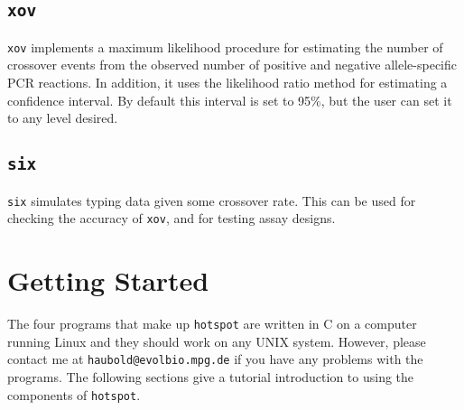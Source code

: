 \documentclass{article}
\newcommand{\ty}{\texttt}
\begin{document}
\subsection{\ty{xov}}
\ty{xov} implements a maximum likelihood procedure for estimating the
number of crossover events from the observed number of positive and
negative allele-specific PCR reactions. In addition, it uses the
likelihood ratio method for estimating a confidence interval. By
default this interval is set to 95\%, but the user can set it to any
level desired.

\subsection{\ty{six}}
\ty{six} simulates typing data given some crossover rate. This can be
used for checking the accuracy of \ty{xov}, and for testing assay
designs. 

\section{Getting Started}
The four programs that make up \ty{hotspot} are written in C on a computer running Linux and
they should
work on any UNIX system. However, please contact me at
\ty{haubold@evolbio.mpg.de} if you have any problems with the
programs. The following sections give a tutorial introduction to using
the components of \ty{hotspot}.
\end{document}
